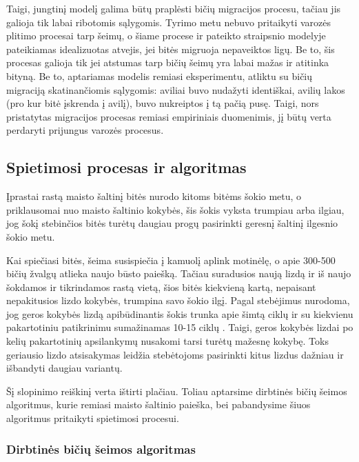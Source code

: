 \documentclass{VUMIFKompMagistrinis}
\begin{document}
Taigi, jungtinį modelį galima būtų praplėsti bičių migracijos procesu, tačiau jis galioja tik labai ribotomis sąlygomis. Tyrimo metu nebuvo pritaikyti varozės plitimo procesai tarp šeimų, o šiame procese ir pateikto straipsnio \cite{BPC16} modelyje pateikiamas idealizuotas atvejis, jei bitės migruoja nepaveiktos ligų. Be to, šis procesas galioja tik jei atstumas tarp bičių šeimų yra labai mažas ir atitinka bityną. Be to, aptariamas modelis remiasi eksperimentu, atliktu su bičių migraciją skatinančiomis sąlygomis: aviliai buvo nudažyti identiškai, avilių lakos (pro kur bitė įskrenda į avilį), buvo nukreiptos į tą pačią pusę. Taigi, nors pristatytas migracijos procesas remiasi empiriniais duomenimis, jį būtų verta perdaryti prijungus varozės procesus.


\subsection{Spietimosi procesas ir algoritmas}

 Įprastai rastą maisto šaltinį bitės nurodo kitoms bitėms šokio metu, o priklausomai nuo maisto šaltinio kokybės, šis šokis vyksta trumpiau arba ilgiau, jog šokį stebinčios bitės turėtų daugiau progų pasirinkti geresnį šaltinį ilgesnio šokio metu. 
 
 Kai spiečiasi bitės, šeima susispiečia į kamuolį aplink motinėlę, o apie 300-500 bičių žvalgų atlieka naujo būsto paiešką. Tačiau suradusios naują lizdą ir iš naujo šokdamos ir tikrindamos rastą vietą, šios bitės kiekvieną kartą, nepaisant nepakitusios lizdo kokybės, trumpina savo šokio ilgį. Pagal stebėjimus nurodoma, jog geros kokybės lizdą apibūdinantis šokis trunka apie šimtą ciklų ir su kiekvienu pakartotiniu patikrinimu sumažinamas 10-15 ciklų \cite{See10}. Taigi, geros kokybės lizdai po kelių pakartotinių apsilankymų nusakomi tarsi turėtų mažesnę kokybę. Toks geriausio lizdo atsisakymas leidžia stebėtojoms pasirinkti kitus lizdus dažniau ir išbandyti daugiau variantų. 
 
 Šį slopinimo reiškinį verta ištirti plačiau. Toliau aptarsime dirbtinės bičių šeimos algoritmus, kurie remiasi maisto šaltinio paieška, bei pabandysime šiuos algoritmus pritaikyti spietimosi procesui.


\subsubsection{Dirbtinės bičių šeimos algoritmas}
\end{document}
